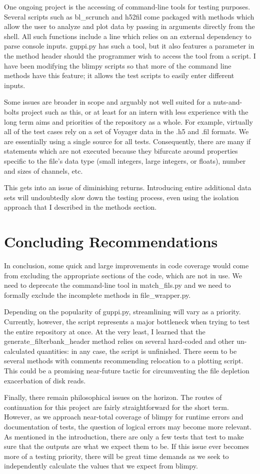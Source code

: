 \documentclass[12pt]{article}
\begin{document}
One ongoing project is the accessing of command-line tools for testing purposes. Several scripts such as bl\_scrunch and h52fil come packaged with methods which allow the user to analyze and plot data by passing in arguments directly from the shell. All such functions include a line which relies on an external dependency to parse console inputs. guppi.py has such a tool, but it also features a parameter in the method header should the programmer wish to access the tool from a script. I have been modifying the blimpy scripts so that more of the command line methods have this feature; it allows the test scripts to easily enter different inputs.

Some issues are broader in scope and arguably not well suited for a nuts-and-bolts project such as this, or at least for an intern with less experience with the long term aims and priorities of the repository as a whole. For example, virtually all of the test cases rely on a set of Voyager data in the .h5 and .fil formats. We are essentially using a single source for all tests. Consequently, there are many if statements which are not executed because they bifurcate around properties specific to the file's data type (small integers, large integers, or floats), number and sizes of channels, etc.

This gets into an issue of diminishing returns. Introducing entire additional data sets will undoubtedly slow down the testing process, even using the isolation approach that I described in the methods section.

\section{Concluding Recommendations}

\quad \quad In conclusion, some quick and large improvements in code coverage would come from excluding the appropriate sections of the code, which are not in use. We need to deprecate the command-line tool in match\_fils.py and we need to formally exclude the incomplete methods in file\_wrapper.py.

Depending on the popularity of guppi.py, streamlining will vary as a priority. Currently, however, the script represents a major bottleneck when trying to test the entire repository at once. At the very least, I learned that the generate\_filterbank\_header method relies on several hard-coded and other un-calculated quantities: in any case, the script is unfinished. There seem to be several methods with comments recommending relocation to a plotting script. This could be a promising near-future tactic for circumventing the file depletion exacerbation of disk reads.

Finally, there remain philosophical issues on the horizon. The routes of continuation for this project are fairly straightforward for the short term. However, as we approach near-total coverage of blimpy for runtime errors and documentation of tests, the question of logical errors may become more relevant. As mentioned in the introduction, there are only a few tests that test to make sure that the outputs are what we expect them to be. If this issue ever becomes more of a testing priority, there will be great time demands as we seek to independently calculate the values that we expect from blimpy.
\end{document}
